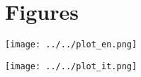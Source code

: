 \documentclass{article}
\renewcommand{\familydefault}{\rmdefault}
\begin{document}
\renewcommand{\familydefault}{\rmdefault}


\fontsize{11}{15}\selectfont{
    
}

\newpage
\section*{Figures}
\begin{center}
    \texttt{[image: ../../plot\_en.png]}
    \label{fig 1: english poem}
\end{center}

\begin{center}
    \texttt{[image: ../../plot\_it.png]}
    \label{fig 2: italian poem}
\end{center}
\end{document}
